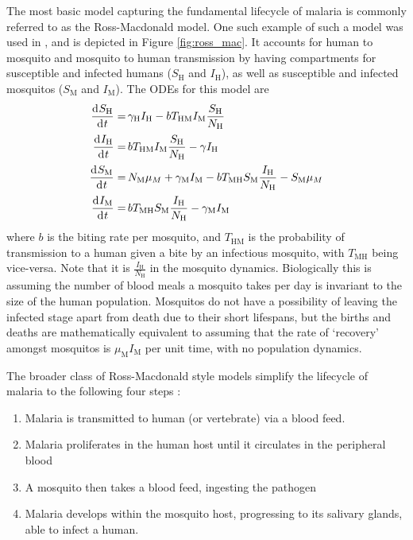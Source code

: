 The most basic model capturing the fundamental lifecycle of malaria is
commonly referred to as the Ross-Macdonald model.
One such example of such a model was used in \cite{aron_population_1982}, and is
depicted in Figure \ref{fig:ross_mac}. It accounts for human to
mosquito and mosquito to human transmission by having compartments for
susceptible and infected humans ($S_\mathrm{H}$ and $I_\mathrm{H}$), as well as
susceptible and infected mosquitos ($S_\mathrm{M}$ and $I_\mathrm{M}$).
The ODEs for this model are
\begin{align*}
    \frac{\diff S_\mathrm{H}}{\diff t}
    = & \, \gamma_\mathrm{H}I_\mathrm{H}
    - bT_{\mathrm{HM}}I_\mathrm{M}\frac{S_\mathrm{H}}{N_\mathrm{H}}      \\
    \frac{\diff I_\mathrm{H}}{\diff t}
    = & \, bT_{\mathrm{HM}}I_\mathrm{M}\frac{S_\mathrm{H}}{N_\mathrm{H}}
    - \gamma I_\mathrm{H}                                                \\
    \frac{\diff S_\mathrm{M}}{\diff t}
    = & \, N_\mathrm{M}\mu_M + \gamma_\mathrm{M}I_\mathrm{M}
    - bT_{\mathrm{MH}}S_\mathrm{M}\frac{I_\mathrm{H}}{N_\mathrm{H}}
    - S_\mathrm{M}\mu_M                                                  \\
    \frac{\diff I_\mathrm{M}}{\diff t}
    = & \, bT_{\mathrm{MH}}S_\mathrm{M}\frac{I_\mathrm{H}}{N_\mathrm{H}}
    - \gamma_\mathrm{M}I_\mathrm{M}
\end{align*}
where $b$ is the biting rate per mosquito, and $T_{\mathrm{HM}}$ is the
probability of transmission to a human given a bite by an infectious mosquito,
with $T_{\mathrm{MH}}$ being vice-versa. Note that it is
$\frac{I_\mathrm{H}}{N_\mathrm{H}}$ in the mosquito dynamics. Biologically this
is assuming the number of blood meals a mosquito takes per day is invariant to
the size of the human population. Mosquitos do not have a possibility of 
leaving the infected stage apart from death due to
their short lifespans, but the births and deaths are mathematically equivalent
to assuming that the rate of `recovery' amongst mosquitos is
$\mu_\mathrm{M}I_\mathrm{M}$ per unit time, with no population dynamics.

The broader class of Ross-Macdonald style models simplify the
lifecycle of malaria to the
following four steps \parencite{smith_ross_2012}:
\begin{enumerate}
    \item Malaria is transmitted to human (or vertebrate) via a blood feed.
    \item Malaria proliferates in the human host until it circulates in the
          peripheral blood
    \item A mosquito then takes a blood feed, ingesting the pathogen
    \item Malaria develops within the mosquito host, progressing to its
          salivary glands, able to infect a human.
\end{enumerate}

